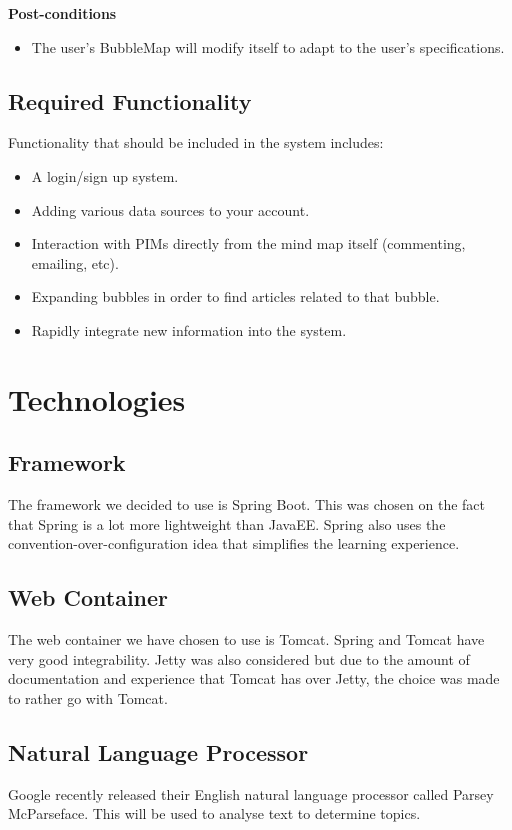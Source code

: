 \documentclass[hidelinks,english]{article}
\begin{document}
    \textbf{Post-conditions}
     \begin{itemize}
        \item The user's BubbleMap will modify itself to adapt to the user's specifications.
    \end{itemize}
    
		
		\subsection{Required Functionality}
			Functionality that should be included in the system includes:
			\begin{itemize}
			\item A login/sign up system. 
			\item Adding various data sources to your account.
			\item Interaction with PIMs directly from the mind map itself (commenting, emailing, etc).
			\item Expanding bubbles in order to find articles related to that bubble.
			\item Rapidly integrate new information into the system.
			\end{itemize}
			
	\section{Technologies}
		\subsection{Framework}
			The framework we decided to use is Spring Boot. This was chosen on the fact that Spring is a lot more lightweight than JavaEE. Spring also uses the convention-over-configuration idea that simplifies the learning experience.
			
		\subsection{Web Container}
			The web container we have chosen to use is Tomcat. Spring and Tomcat have very good integrability. Jetty was also considered but due to the amount of documentation and experience that Tomcat has over Jetty, the choice was made to rather go with Tomcat.
		
		\subsection{Natural Language Processor}
			Google recently released their English natural language processor called Parsey McParseface. This will be used to analyse text to determine topics.
			
\end{document}

